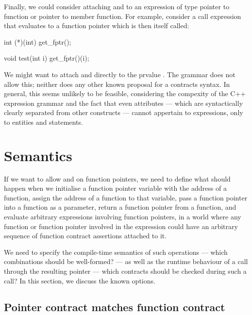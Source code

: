 Finally, we could consider attaching  and  to an expression of type pointer to function or pointer to member function. For example, consider a call expression that evaluates to a function pointer which is then itself called:

\begin{codeblock}
int (*)(int) get_fptr();

void test(int i) {
  get_fptr()(i);
}
\end{codeblock}
We might want to attach  and  directly to the prvalue . The \cite{P2900R8} grammar does not allow this; neither does any other known proposal for a contracts syntax. In general, this seems unlikely to be feasible, considering the compexity of the C++ expression grammar and the fact that even attributes --- which are syntactically clearly separated from other constructs --- cannot appertain to expressions, only to entities and statements.


\section{Semantics}
\label{semantics}

If we want to allow  and  on function pointers, we need to define what should happen when we initialise a function pointer variable with the address of a function, assign the address of a function to that variable, pass a function pointer into a function as a parameter, return a function pointer from a function, and evaluate arbitrary expressions involving function pointers, in a world where any function or function pointer involved in the expression could have an arbitrary sequence of function contract assertions attached to it.

We need to specify the compile-time semantics of such operations --- which combinations should be well-formed? --- as well as the runtime behaviour of a call through the resulting pointer --- which contracts should be checked during such a call? In this section, we discuss the known options.


\subsection{Pointer contract matches function contract}
\label{matching}

